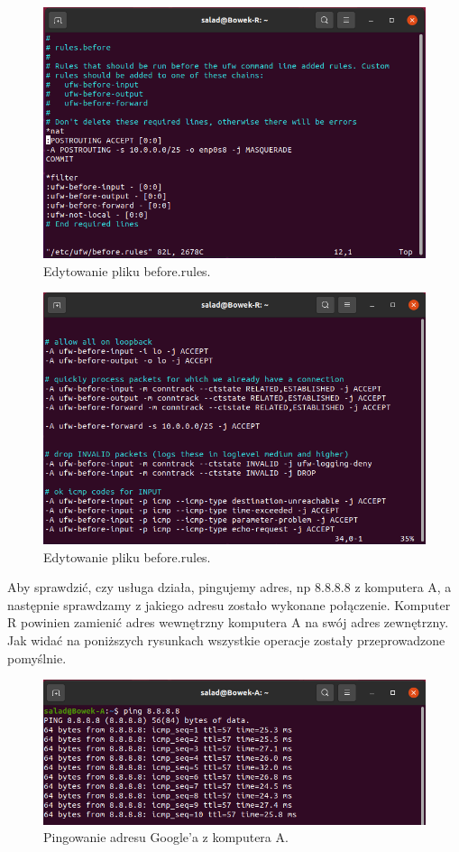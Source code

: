\documentclass{article}
\begin{document}
\begin{figure}[H]
    \centering
    \includegraphics[scale = 0.75]{NAT/nat1.png}  
    \caption{Edytowanie pliku before.rules.}
    \label{2}
\end{figure}

\begin{figure}[H]
    \centering
    \includegraphics[scale = 0.75]{NAT/nat2.png}  
    \caption{Edytowanie pliku before.rules.}
    \label{2}
\end{figure}
\newpage
\justify
Aby sprawdzić, czy usługa działa, pingujemy adres, np 8.8.8.8 z komputera A, a następnie sprawdzamy z jakiego adresu zostało wykonane połączenie. Komputer R powinien zamienić adres wewnętrzny komputera A na swój adres zewnętrzny. Jak widać na poniższych rysunkach wszystkie operacje zostały przeprowadzone pomyślnie.
\begin{figure}[H]
    \centering
    \includegraphics[scale = 0.85]{NAT/nat3A.png}  
    \caption{Pingowanie adresu Google'a z komputera A.}
    \label{2}
\end{figure}
\end{document}
